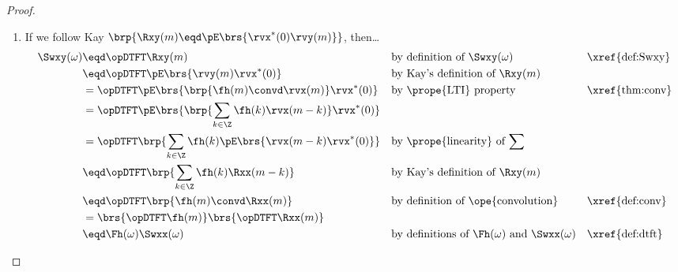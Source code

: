 \begin{proof}
\begin{enumerate}
\item If we follow Kay $\brp{\Rxy(m)\eqd\pE\brs{\rvx^\ast(0)\rvy(m)}}$, then\ldots
  \begin{align*}
    \Swxy(\omega)
      &\eqd \opDTFT\Rxy(m)
      && \text{by definition of $\Swxy(\omega)$}
      && \text{\xref{def:Swxy}}
    \\&\eqd \opDTFT\pE\brs{\rvy(m)\rvx^\ast(0)}
      && \text{by Kay's definition of $\Rxy(m)$}
    \\&=    \opDTFT\pE\brs{\brp{\fh(m)\convd\rvx(m)}\rvx^\ast(0)}
      && \text{by \prope{LTI} property}
      && \text{\xref{thm:conv}}
    \\&=    \opDTFT\pE\brs{\brp{\sum_{k\in\Z} \fh(k)\rvx(m-k)}\rvx^\ast(0)}
    \\&=    \opDTFT\brp{\sum_{k\in\Z} \fh(k)\pE\brs{\rvx(m-k)\rvx^\ast(0)}}
      && \text{by \prope{linearity} of $\sum$}
    \\&\eqd \opDTFT\brp{\sum_{k\in\Z} \fh(k)\Rxx(m-k)}
      && \text{by Kay's definition of $\Rxy(m)$}
    \\&\eqd \opDTFT\brp{\fh(m)\convd\Rxx(m)}
      && \text{by definition of \ope{convolution}}
      && \text{\xref{def:conv}}
    \\&=    \brs{\opDTFT\fh(m)}\brs{\opDTFT\Rxx(m)}
    \\&\eqd \Fh(\omega) \Swxx(\omega)
      && \text{by definitions of $\Fh(\omega)$ and $\Swxx(\omega)$}
      && \text{\xref{def:dtft}}
  \end{align*}


\end{enumerate}
\end{proof}
